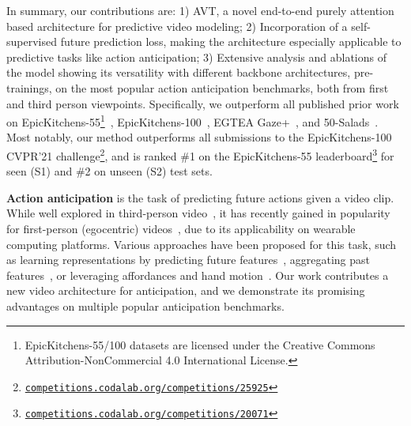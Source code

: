 \documentclass[10pt,twocolumn,letterpaper]{article}
\newcommand{\eknewfull}{EpicKitchens-100\xspace}
\newcommand{\ekfull}{EpicKitchens-55\xspace}
\newcommand{\saladfull}{50-Salads\xspace}
\newcommand{\egtea}{EGTEA Gaze+\xspace}
\newcommand{\method}{AVT\xspace}
\begin{document}
In summary, our contributions are: 1) \method, a novel end-to-end purely attention based architecture  for predictive video modeling;
2) Incorporation of a self-supervised future prediction loss, making the architecture especially applicable to predictive tasks like action anticipation;
3) Extensive analysis and ablations of the model showing its versatility  with different backbone architectures, pre-trainings, \etc on the most popular action anticipation benchmarks, both from first and third person viewpoints. Specifically, we outperform all published prior work on \ekfull{}\footnote{\label{ekfootnote}\ekfull/100 datasets are licensed under the Creative Commons Attribution-NonCommercial 4.0 International License.}~\cite{Damen2018EPICKITCHENS}, 
\eknewfull{}~\cite{damen2020rescaling}, \egtea~\cite{li2018eye}, and \saladfull~\cite{stein2013combining}. 
Most notably, our method outperforms all submissions to the \eknewfull CVPR'21 challenge\footnote{\href{https://competitions.codalab.org/competitions/25925}{\tt competitions.codalab.org/competitions/25925}}, and is ranked \#1 on the \ekfull leaderboard\footnote{\href{https://competitions.codalab.org/competitions/20071}{\tt competitions.codalab.org/competitions/20071}} for seen (S1) and \#2 on unseen (S2) test sets. 

    





{\noindent \bf Action anticipation} is the task of predicting future actions given a video clip. While well explored in third-person video~\cite{stein2013combining,kuehne2014language,huang2014action,koppula2015anticipating,vondrick2016anticipating,jain2016recurrent,gao2017red,abu2018will}, it has recently gained in popularity for first-person (egocentric) videos~\cite{Damen2018EPICKITCHENS,sener2020temporal,liu2020forecasting,furnari2020rulstm,nagrajan2020egotopo,damen2020rescaling,dessalene2021forecasting}, due to its applicability on wearable computing platforms. Various approaches have been proposed for this task, such as learning representations by predicting future features~\cite{vondrick2016anticipating,wu2021imaginernn}, aggregating past features~\cite{furnari2020rulstm,sener2020temporal}, or leveraging affordances and hand motion~\cite{nagrajan2020egotopo,liu2020forecasting}. Our work contributes a new video architecture for anticipation, and we demonstrate its promising advantages on 
multiple
popular anticipation benchmarks.
\end{document}
